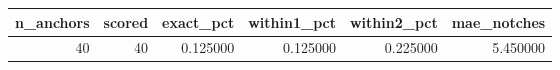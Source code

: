 \begin{tabular}{rrrrrr}
\toprule
n_anchors & scored & exact_pct & within1_pct & within2_pct & mae_notches \\
\midrule
40 & 40 & 0.125000 & 0.125000 & 0.225000 & 5.450000 \\
\bottomrule
\end{tabular}

